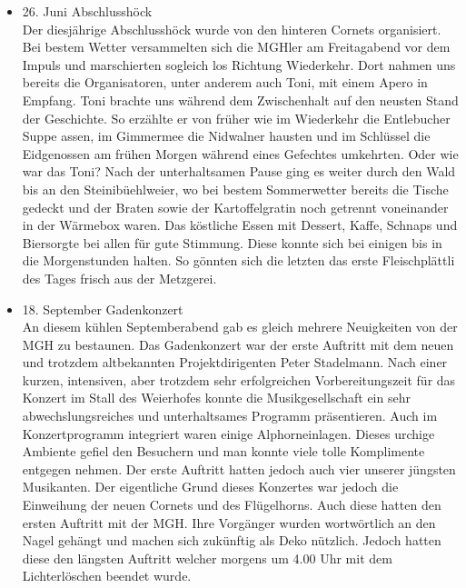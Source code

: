 \begin{history}
\begin{itemize}
            \item 26. Juni Abschlusshöck\\
                  Der diesjährige Abschlusshöck wurde von den hinteren Cornets
                  organisiert. Bei bestem Wetter versammelten sich die MGHler am
                  Freitagabend vor dem Impuls und marschierten sogleich los
                  Richtung Wiederkehr. Dort nahmen uns bereits die
                  Organisatoren, unter anderem auch Toni, mit einem Apero in
                  Empfang. Toni brachte uns während dem Zwischenhalt auf den
                  neusten Stand der Geschichte. So erzählte er von früher wie im
                  Wiederkehr die Entlebucher Suppe assen, im Gimmermee die
                  Nidwalner hausten und im Schlüssel die Eidgenossen am frühen
                  Morgen während eines Gefechtes umkehrten. Oder wie war das
                  Toni? Nach der unterhaltsamen Pause ging es weiter durch den
                  Wald bis an den Steinibüehlweier, wo bei bestem Sommerwetter
                  bereits die Tische gedeckt und der Braten sowie der
                  Kartoffelgratin noch getrennt voneinander in der Wärmebox
                  waren. Das köstliche Essen mit Dessert, Kaffe, Schnaps und
                  Biersorgte bei allen für gute Stimmung. Diese konnte sich bei
                  einigen bis in die Morgenstunden halten. So gönnten sich die
                  letzten das erste Fleischplättli des Tages frisch aus der
                  Metzgerei.

            \item 18. September Gadenkonzert\\
                  An diesem kühlen Septemberabend gab es gleich mehrere
                  Neuigkeiten von der MGH zu bestaunen. Das Gadenkonzert war der
                  erste Auftritt mit dem neuen und trotzdem altbekannten
                  Projektdirigenten Peter Stadelmann. Nach einer kurzen,
                  intensiven, aber trotzdem sehr erfolgreichen Vorbereitungszeit
                  für das Konzert im Stall des Weierhofes konnte die
                  Musikgesellschaft ein sehr abwechslungsreiches und
                  unterhaltsames Programm präsentieren. Auch im Konzertprogramm
                  integriert waren einige Alphorneinlagen. Dieses urchige
                  Ambiente gefiel den Besuchern und man konnte viele tolle
                  Komplimente entgegen nehmen. Der erste Auftritt hatten jedoch
                  auch vier unserer jüngsten Musikanten. Der eigentliche Grund
                  dieses Konzertes war jedoch die Einweihung der neuen Cornets
                  und des Flügelhorns. Auch diese hatten den ersten Auftritt mit
                  der MGH. Ihre Vorgänger wurden wortwörtlich an den Nagel
                  gehängt und machen sich zukünftig als Deko nützlich. Jedoch
                  hatten diese den längsten Auftritt welcher morgens um 4.00 Uhr
                  mit dem Lichterlöschen beendet wurde.


\end{itemize}
\end{history}
